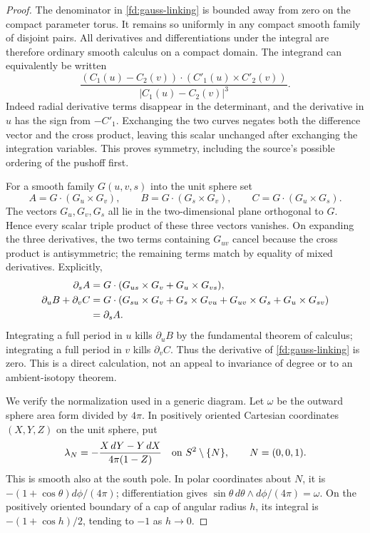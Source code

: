 \begin{proof}\leanok
The denominator in \eqref{fd:gauss-linking} is bounded away from zero
on the compact parameter torus. It remains so uniformly in any compact
smooth family of disjoint pairs. All derivatives and differentiations
under the integral are therefore ordinary smooth calculus on a compact
domain. The integrand can equivalently be written
\begin{equation}\label{fd:gauss-integrand}
 \frac{(C_1(u)-C_2(v))\cdot(C'_1(u)\times C'_2(v))}
 {|C_1(u)-C_2(v)|^3}.
\end{equation}
Indeed radial derivative terms disappear in the determinant, and the
derivative in $u$ has the sign from $-C'_1$. Exchanging the two curves
negates both the difference vector and the cross product, leaving this
scalar unchanged after exchanging the integration variables. This proves
symmetry, including the source's possible ordering of the pushoff first.

For a smooth family $G(u,v,s)$ into the unit sphere set
\begin{equation}
 A=G\cdot(G_u\times G_v),\qquad
 B=G\cdot(G_s\times G_v),\qquad
 C=G\cdot(G_u\times G_s).
\end{equation}
The vectors $G_u,G_v,G_s$ all lie in the two-dimensional plane
orthogonal to $G$. Hence every scalar triple product of these three
vectors vanishes. On expanding the three derivatives, the two terms
containing $G_{uv}$ cancel because the cross product is antisymmetric;
the remaining terms match by equality of mixed derivatives. Explicitly,
\begin{align}
 \partial_s A
 &=G\cdot(G_{us}\times G_v+G_u\times G_{vs}),\notag\\
 \partial_u B+\partial_v C
 &=G\cdot(G_{su}\times G_v+G_s\times G_{vu}
                   +G_{uv}\times G_s+G_u\times G_{sv})\notag\\
 &=\partial_s A.
 \label{fd:gauss-divergence}
\end{align}
Integrating a full period in $u$ kills $\partial_u B$ by the
fundamental theorem of calculus; integrating a full period in $v$
kills $\partial_v C$. Thus the derivative of
\eqref{fd:gauss-linking} is zero. This is a direct calculation, not
an appeal to invariance of degree or to an ambient-isotopy theorem.

We verify the normalization used in a generic diagram. Let $\omega$
be the outward sphere area form divided by $4\pi$. In positively
oriented Cartesian coordinates $(X,Y,Z)$ on the unit sphere, put
\begin{equation}\label{fd:sphere-primitive}
 \lambda_N=-\frac{X\,dY-Y\,dX}{4\pi(1-Z)}
          \quad\hbox{on }S^2\setminus\{N\},\qquad N=(0,0,1).
\end{equation}
This is smooth also at the south pole. In polar coordinates about
$N$, it is $-(1+\cos\theta)d\phi/(4\pi)$; differentiation
gives $\sin\theta\,d\theta\wedge d\phi/(4\pi)=\omega$.
On the positively oriented boundary of a cap of angular radius $h$,
its integral is $-(1+\cos h)/2$, tending to $-1$ as $h\to0$.


\end{proof}

